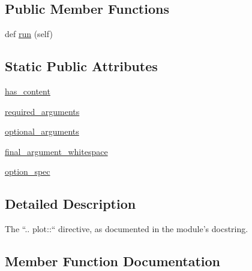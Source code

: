 \subsection*{Public Member Functions}
\begin{DoxyCompactItemize}
\item 
def \hyperlink{classmatplotlib_1_1sphinxext_1_1plot__directive_1_1PlotDirective_af5835a77cbe4881f72d1168a879871c0}{run} (self)
\end{DoxyCompactItemize}
\subsection*{Static Public Attributes}
\begin{DoxyCompactItemize}
\item 
\hyperlink{classmatplotlib_1_1sphinxext_1_1plot__directive_1_1PlotDirective_a8c2672c3f3ff5c0f438cd2be3c54b228}{has\+\_\+content}
\item 
\hyperlink{classmatplotlib_1_1sphinxext_1_1plot__directive_1_1PlotDirective_a13bb9291f668f0878a649fd42d37471a}{required\+\_\+arguments}
\item 
\hyperlink{classmatplotlib_1_1sphinxext_1_1plot__directive_1_1PlotDirective_a8ef776e1de1f0e494f25a069f16b7a44}{optional\+\_\+arguments}
\item 
\hyperlink{classmatplotlib_1_1sphinxext_1_1plot__directive_1_1PlotDirective_a21700a440d966a6bc23d05d456b5e766}{final\+\_\+argument\+\_\+whitespace}
\item 
\hyperlink{classmatplotlib_1_1sphinxext_1_1plot__directive_1_1PlotDirective_a865426b44d0406a4aa7e55975f6e801e}{option\+\_\+spec}
\end{DoxyCompactItemize}


\subsection{Detailed Description}
\begin{DoxyVerb}The ``.. plot::`` directive, as documented in the module's docstring.\end{DoxyVerb}
 

\subsection{Member Function Documentation}
\mbox{\label{classmatplotlib_1_1sphinxext_1_1plot__directive_1_1PlotDirective_af5835a77cbe4881f72d1168a879871c0}} 
